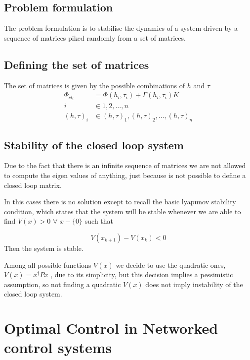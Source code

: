 \documentclass[nols]{tufte-handout}
\theoremstyle{definition}
\begin{document}
\subsection{Problem formulation}
The problem formulation is to stabilise the dynamics of a system driven by a sequence of matrices piked randomly from a set of matrices.




\subsection{Defining the set of matrices}
The set of matrices is given by the possible combinations of $h$ and $\tau$ 
\begin{align}
    \Phi_{cl_i}&=\Phi(h_i,\tau_i)+\Gamma(h_i,\tau_i)K\nonumber\\
    i&\in{1,2,\dots,n}\nonumber\\
    (h,\tau)_i&\in{(h,\tau)_1,(h,\tau)_2,\dots,(h,\tau)_n}
\end{align}

\subsection{Stability of the closed loop system}
Due to the fact that there is an infinite sequence of matrices we are not allowed to compute the eigen values of anything, just because is not possible to define a closed loop matrix.

In this cases there is no solution except to recall the basic lyapunov stability condition, which states that the system will be stable whenever we are able to find $V(x)>0 \,\,\forall \,\,x -\{0\}$  such that

\[
V(x_{k+1})-V(x_k)<0
\]
Then the system is stable.

Among all possible functions $V(x)$ we decide to use the quadratic ones,$V(x)=x^{\dag} Px$ ,  due to its simplicity, but this decision implies a pessimistic assumption, so not finding a quadratic $V(x)$ does not imply instability of the closed loop system.


\section{Optimal Control in Networked control systems}
\end{document}
